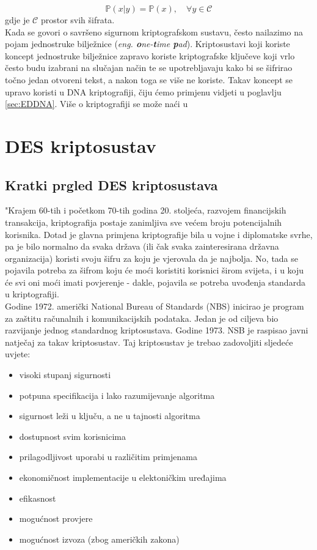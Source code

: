 \documentclass[a4paper,oneside,12pt]{memoir} %
\begin{document}
\begin{spacing}{1.5}
\[\mathbb{P}(x|y)=\mathbb{P}(x), \quad \forall	 y \in \mathcal{C}\] 
gdje je $\mathcal{C}$ prostor svih šifrata.\\ 
Kada se govori o savršeno sigurnom kriptografskom sustavu, često nailazimo na pojam jednostruke bilježnice (\textit{eng. \textbf{o}ne-\textbf{t}ime \textbf{p}ad}). Kriptosustavi koji koriste koncept jednostruke bilježnice zapravo koriste kriptografske ključeve koji vrlo često budu izabrani na slučajan način te se upotrebljavaju kako bi se šifrirao točno jedan otvoreni tekst, a nakon toga se više ne koriste. Takav koncept se upravo koristi u DNA kriptografiji, čiju ćemo primjenu vidjeti u poglavlju \ref{sec:EDDNA}.
Više o kriptografiji se može naći u \cite{duje}
\section{DES kriptosustav}	
\subsection{Kratki prgled DES kriptosustava}
"Krajem 60-tih i početkom 70-tih godina 20. stoljeća, razvojem financijskih transakcija, kriptografija postaje zanimljiva sve većem broju potencijalnih korisnika. Dotad je glavna primjena kriptografije bila u vojne i diplomatske svrhe, pa je bilo normalno da svaka država (ili čak svaka zainteresirana državna organizacija) koristi svoju šifru za koju je vjerovala da je najbolja. No, tada se pojavila potreba za šifrom koju će moći koristiti korisnici širom svijeta, i u koju će svi oni moći imati povjerenje - dakle, pojavila se potreba uvođenja standarda u kriptografiji.\\
Godine 1972. američki National Bureau of Standards (NBS) inicirao je program za zaštitu računalnih i komunikacijskih podataka. Jedan je od ciljeva bio razvijanje jednog standardnog kriptosustava. Godine 1973. NSB je raspisao javni natječaj za takav kriptosustav. Taj kriptosustav je trebao zadovoljiti sljedeće uvjete:
\begin{itemize}
\item visoki stupanj sigurnosti
\item potpuna specifikacija i lako razumijevanje algoritma
\item sigurnost leži u ključu, a ne u tajnosti algoritma
\item dostupnost svim korisnicima
\item prilagodljivost uporabi u različitim primjenama
\item ekonomičnost implementacije u elektoničkim uređajima
\item efikasnost
\item mogućnost provjere
\item mogućnost izvoza (zbog američkih zakona)
\end{itemize}


\end{spacing}
\end{document}

